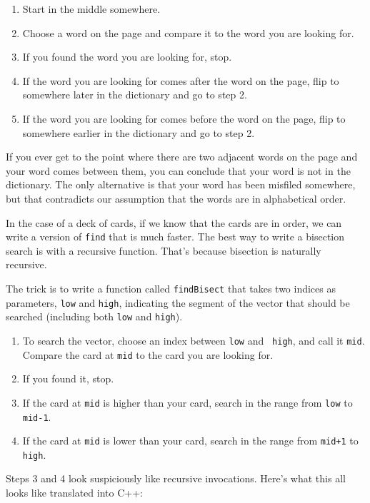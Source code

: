 \begin {enumerate}

\item Start in the middle somewhere.

\item Choose a word on the page and compare it to the word you
are looking for.

\item If you found the word you are looking for, stop.

\item If the word you are looking for comes after the word on
the page, flip to somewhere later in the dictionary and go to
step 2.

\item If the word you are looking for comes before the word on
the page, flip to somewhere earlier in the dictionary and go to
step 2.

\end {enumerate}

If you ever get to the point where there are two adjacent words on the
page and your word comes between them, you can conclude that your word
is not in the dictionary.  The only alternative is that your word has
been misfiled somewhere, but that contradicts our assumption that the
words are in alphabetical order.

In the case of a deck of cards, if we know that the cards are in
order, we can write a version of {\tt find} that is much faster.  The
best way to write a bisection search is with a recursive function.
That's because bisection is naturally recursive.


The trick is to write a function called {\tt findBisect} that takes
two indices as parameters, {\tt low} and {\tt high}, indicating the
segment of the vector that should be searched (including both
{\tt low} and {\tt high}).

\begin{enumerate}

\item To search the vector, choose an index between {\tt low} and {\tt
high}, and call it {\tt mid}.  Compare the card at {\tt mid} to the
card you are looking for.

\item If you found it, stop.

\item If the card at {\tt mid} is higher than your card, search
in the range from {\tt low} to {\tt mid-1}.

\item If the card at {\tt mid} is lower than your card, search
in the range from {\tt mid+1} to {\tt high}.

\end{enumerate}
%
Steps 3 and 4 look suspiciously like recursive
invocations.  Here's what this all looks like translated into
C++:

